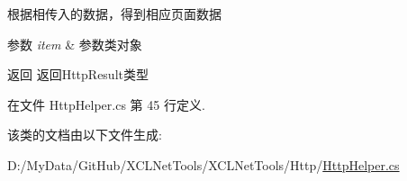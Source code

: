 根据相传入的数据，得到相应页面数据 


\begin{DoxyParams}{参数}
{\em item} & 参数类对象\\
\hline
\end{DoxyParams}
\begin{DoxyReturn}{返回}
返回\+Http\+Result类型
\end{DoxyReturn}


在文件 Http\+Helper.\+cs 第 45 行定义.



该类的文档由以下文件生成\+:\begin{DoxyCompactItemize}
\item 
D\+:/\+My\+Data/\+Git\+Hub/\+X\+C\+L\+Net\+Tools/\+X\+C\+L\+Net\+Tools/\+Http/\hyperlink{_http_helper_8cs}{Http\+Helper.\+cs}\end{DoxyCompactItemize}
